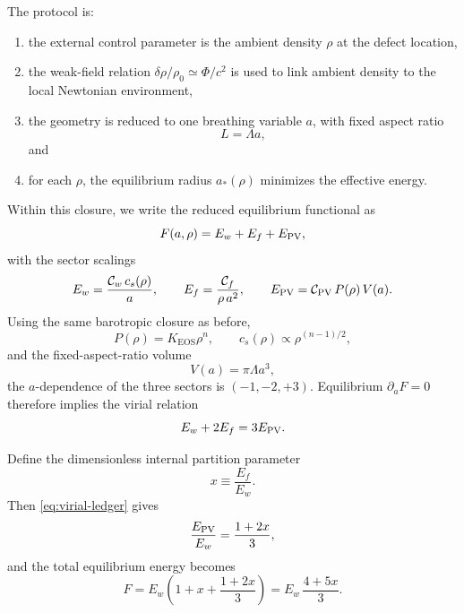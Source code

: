 \documentclass[11pt]{article}
\newcommand{\KEOS}{K_{\mathrm{EOS}}}
\newcommand{\PhiN}{\Phi}
\begin{document}
The protocol is:
\begin{enumerate}[leftmargin=1.5em]
  \item the external control parameter is the ambient density \(\rho\) at the defect
  location,
  \item the weak-field relation \(\delta \rho/\rho_0 \simeq \PhiN/c^2\) is used to link
  ambient density to the local Newtonian environment,
  \item the geometry is reduced to one breathing variable \(a\), with fixed aspect ratio
  \begin{equation}
  L=\Lambda a,
  \label{eq:fixed-aspect-ratio}
  \end{equation}
  and
  \item for each \(\rho\), the equilibrium radius \(a_*(\rho)\) minimizes the effective
  energy.
\end{enumerate}

Within this closure, we write the reduced equilibrium functional as
\begin{equation}
F(a,\rho)=E_w+E_f+E_{\rm PV},
\label{eq:F-split}
\end{equation}
with the sector scalings
\begin{equation}
E_w=\frac{\mathcal C_w\,c_s(\rho)}{a},
\qquad
E_f=\frac{\mathcal C_f}{\rho\,a^2},
\qquad
E_{\rm PV}=\mathcal C_{\rm PV}\,P(\rho)\,V(a).
\label{eq:sector-scalings}
\end{equation}
Using the same barotropic closure as before,
\begin{equation}
P(\rho)=\KEOS \rho^n,
\qquad
c_s(\rho)\propto \rho^{(n-1)/2},
\label{eq:closure-eos-ledger}
\end{equation}
and the fixed-aspect-ratio volume
\begin{equation}
V(a)=\pi \Lambda a^3,
\label{eq:volume-a}
\end{equation}
the \(a\)-dependence of the three sectors is \((-1,-2,+3)\). Equilibrium
\(\partial_a F=0\) therefore implies the virial relation
\begin{equation}
E_w+2E_f=3E_{\rm PV}.
\label{eq:virial-ledger}
\end{equation}

Define the dimensionless internal partition parameter
\begin{equation}
x\equiv \frac{E_f}{E_w}.
\label{eq:x-def}
\end{equation}
Then \eqref{eq:virial-ledger} gives
\begin{equation}
\frac{E_{\rm PV}}{E_w}=\frac{1+2x}{3},
\label{eq:EPV-over-Ew}
\end{equation}
and the total equilibrium energy becomes
\begin{equation}
F
=
E_w\left(1+x+\frac{1+2x}{3}\right)
=
E_w\,\frac{4+5x}{3}.
\label{eq:F-over-Ew}
\end{equation}
\end{document}
